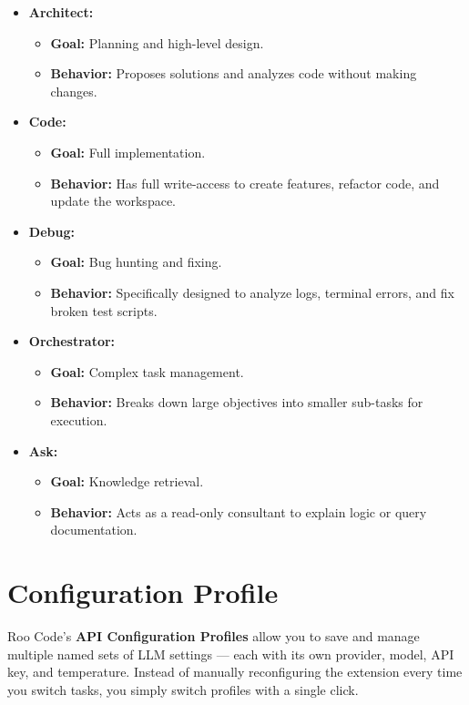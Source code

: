 \begin{itemize}
   \item \textbf{Architect:}
      \begin{itemize}
         \item \textbf{Goal:} Planning and high-level design.
         \item \textbf{Behavior:} Proposes solutions and analyzes code without
            making changes.
      \end{itemize}
   \item \textbf{Code:}
      \begin{itemize}
         \item \textbf{Goal:} Full implementation.
         \item \textbf{Behavior:} Has full write-access to create features,
            refactor code, and update the workspace.
      \end{itemize}
   \item \textbf{Debug:}
      \begin{itemize}
         \item \textbf{Goal:} Bug hunting and fixing.
         \item \textbf{Behavior:} Specifically designed to analyze logs,
            terminal errors, and fix broken test scripts.
      \end{itemize}
   \item \textbf{Orchestrator:}
      \begin{itemize}
         \item \textbf{Goal:} Complex task management.
         \item \textbf{Behavior:} Breaks down large objectives into smaller
            sub-tasks for execution.
      \end{itemize}
   \item \textbf{Ask:}
      \begin{itemize}
         \item \textbf{Goal:} Knowledge retrieval.
         \item \textbf{Behavior:} Acts as a read-only consultant to explain
            logic or query documentation.
      \end{itemize}
\end{itemize}

\section{Configuration Profile}

Roo Code's \textbf{API Configuration Profiles} allow you to save and manage
multiple named sets of LLM settings — each with its own provider, model,
API key, and temperature.
Instead of manually reconfiguring the extension every time you switch tasks,
you simply switch profiles with a single click.

